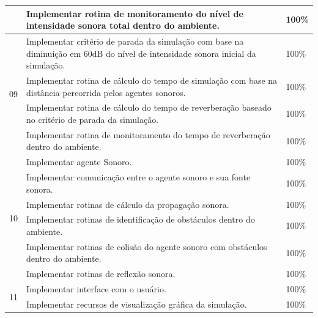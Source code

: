 \begin{center}
\begin{longtable}{|c|p{11.5cm}|l|}
                    & Implementar rotina de monitoramento do nível de intensidade sonora total dentro do ambiente.                                    & 100\%      \\ \hline
\multirow{4}{*}{09} & Implementar critério de parada da simulação com base na diminuição em 60dB do nível de intensidade sonora inicial da simulação. & 100\%      \\ \cline{2-3} 
                    & Implementar rotina de cálculo do tempo de simulação com base na distância percorrida pelos agentes sonoros.                     & 100\%      \\ \cline{2-3} 
                    & Implementar rotina de cálculo do tempo de reverberação baseado no critério de parada da simulação.                              & 100\%      \\ \cline{2-3} 
                    & Implementar rotina de monitoramento do tempo de reverberação dentro do ambiente.                                                & 100\%      \\ \hline
\multirow{6}{*}{10} & Implementar agente Sonoro.                                                                                                      & 100\%      \\ \cline{2-3} 
                    & Implementar comunicação entre o agente sonoro e sua fonte sonora.                                                               & 100\%      \\ \cline{2-3} 
                    & Implementar rotinas de cálculo da propagação sonora.                                                                            & 100\%      \\ \cline{2-3} 
                    & Implementar rotinas de identificação de obstáculos dentro do ambiente.                                                          & 100\%      \\ \cline{2-3} 
                    & Implementar rotinas de colisão do agente sonoro com obstáculos dentro do ambiente.                                              & 100\%      \\ \cline{2-3} 
                    & Implementar rotinas de reflexão sonora.                                                                                         & 100\%      \\ \hline
\multirow{2}{*}{11} & Implementar interface com o usuário.                                                                                            & 100\%      \\ \cline{2-3} 
                    & Implementar recursos de visualização gráfica da simulação.                                                                      & 100\%      \\ \hline
\end{longtable}
\end{center}


